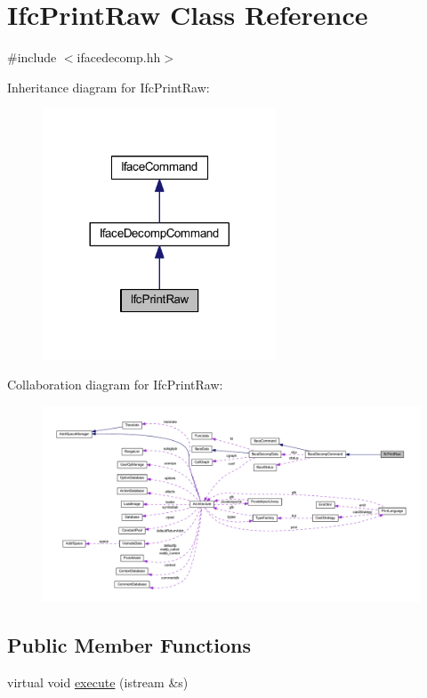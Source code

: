 \hypertarget{class_ifc_print_raw}{}\section{Ifc\+Print\+Raw Class Reference}
\label{class_ifc_print_raw}


{\ttfamily \#include $<$ifacedecomp.\+hh$>$}



Inheritance diagram for Ifc\+Print\+Raw\+:
\nopagebreak
\begin{figure}[H]
\begin{center}
\leavevmode
\includegraphics[width=197pt]{class_ifc_print_raw__inherit__graph}
\end{center}
\end{figure}


Collaboration diagram for Ifc\+Print\+Raw\+:
\nopagebreak
\begin{figure}[H]
\begin{center}
\leavevmode
\includegraphics[width=350pt]{class_ifc_print_raw__coll__graph}
\end{center}
\end{figure}
\subsection*{Public Member Functions}
\begin{DoxyCompactItemize}
\item 
virtual void \mbox{\hyperlink{class_ifc_print_raw_a9aecf31758a44ef1e025eb867e267529}{execute}} (istream \&s)
\end{DoxyCompactItemize}
